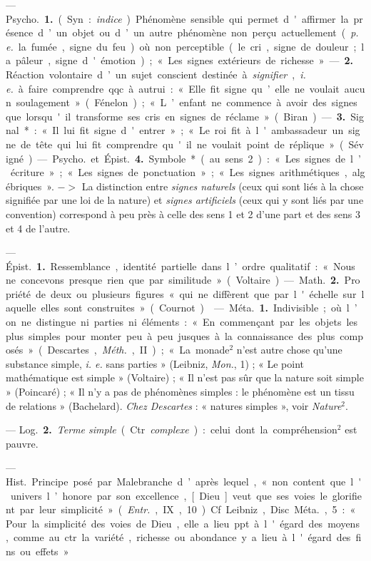 \begin{itemize}[leftmargin=1cm, label=, itemsep=1pt]
 — \si{Psycho.} {\bf 1.} (Syn. : {\it indice}). Phénomène sensible
qui permet d'affirmer la présence d’un objet ou d’un autre phénomène non
perçu actuellement ({\it p. e.} la fumée, signe du feu) où non perceptible
(le cri, signe de douleur ; la pâleur, signe d'émotion) ; « Les signes
extérieurs de richesse ». — {\bf 2.} Réaction volontaire d’un sujet conscient
destinée à {\it signifier}, {\it i. e.} à faire comprendre qqc. à autrui : «
Elle fit signe qu’elle ne voulait aucun soulagement » (Fénelon) ; « L’enfant
ne commence à avoir des signes que lorsqu'il transforme ses cris en signes de
réclame » (Biran). — {\bf 3.} Signal* : « Il lui fit signe d'entrer » ; « Le
roi fit à l'ambassadeur un signe de tête qui lui fit comprendre qu'il ne
voulait point de réplique » (Sévigné). — \si{Psycho.} et \si{Épist.} {\bf 4.}
Symbole* (au sens 2) : « Les signes de l’écriture »; « Les signes de
ponctuation »; « Les signes arithmétiques, algébriques ». $->$ La distinction
entre {\it signes naturels} (ceux qui sont liés à la chose signifiée par une
loi de la nature) et {\it signes artificiels} (ceux qui y sont liés par une
convention) correspond à peu près à celle des sens 1 et 2 d’une part et des
sens 3 et 4 de l'autre.

 — \si{Épist.} {\bf 1.} Ressemblance, identité partielle dans
l’ordre qualitatif : « Nous ne concevons presque rien que par
similitude » (Voltaire). — \si{Math.} {\bf 2.} Propriété de deux ou plusieurs
figures « qui ne diffèrent
que par l'échelle sur laquelle elles sont construites » (Cournot).

 — \si{Méta.} {\bf 1.} Indivisible ; où l’on ne distingue ni
parties ni éléments : « ... En commençant par les objets les plus simples...
pour monter peu à peu jusques à la connaissance des plus
composés » (Descartes, {\it Méth.}, II) ; « La monade$^2$ n’est autre chose
qu’une substance simple, {\it i. e.} sans parties » (Leibniz, {\it Mon.},
1) ; « Le point mathématique est simple » (Voltaire) ; « Il n’est pas sûr que
la nature soit simple » (Poincaré) ; « Il n'y a pas de phénomènes simples :
le phénomène est un tissu de relations » (Bachelard). {\it Chez Descartes} :
« natures simples », voir {\it Nature}$^2$.

— \si{Log.} {\bf 2.} {\it Terme simple} (Ctr.
{\it complexe}) : celui dont la compréhension$^2$ est pauvre.

 — \si{Hist.} Principe posé par Malebranche d’après
lequel, « non content que l'univers l’honore par son excellence, [Dieu] veut
que ses voies le glorifient par leur simplicité » ({\it Entr.}, IX, 10). Cf.
Leibniz, Disc. \si{Méta.}, 5 : « Pour la simplicité des voies de Dieu, elle a
lieu ppt. à l'égard des moyens, comme au ctr. la variété, richesse ou
abondance y a lieu à l'égard des fins ou effets. »


\end{itemize}
